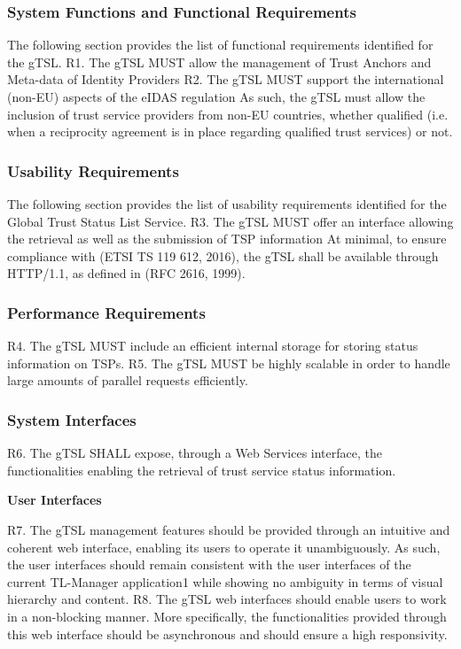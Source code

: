 \documentclass{tnreport}
\begin{document}
\subsubsection{System Functions and Functional Requirements}

The following section provides the list of functional requirements identified for the gTSL.
R1. The gTSL MUST allow the management of Trust Anchors and Meta-data of Identity Providers
R2. The gTSL MUST support the international (non-EU) aspects of the eIDAS regulation
As such, the gTSL must allow the inclusion of trust service providers from non-EU countries, whether qualified (i.e. when a reciprocity agreement is in place regarding qualified trust services) or not.

\subsubsection{Usability Requirements}

The following section provides the list of usability requirements identified for the Global Trust Status List Service.
R3. The gTSL MUST offer an interface allowing the retrieval as well as the submission of TSP information
At minimal, to ensure compliance with (ETSI TS 119 612, 2016), the gTSL shall be available through HTTP/1.1, as defined in (RFC 2616, 1999).

\subsubsection{Performance Requirements}

R4. The gTSL MUST include an efficient internal storage for storing status information on TSPs.
R5. The gTSL MUST be highly scalable in order to handle large amounts of parallel requests efficiently.

\subsubsection{System Interfaces}

R6. The gTSL SHALL expose, through a Web Services interface, the functionalities enabling the retrieval of trust service status information.

\textbf{User Interfaces}

R7. The gTSL management features should be provided through an intuitive and coherent web interface, enabling its users to operate it unambiguously.
As such, the user interfaces should remain consistent with the user interfaces of the current TL-Manager application1 while showing no ambiguity in terms of visual hierarchy and content.
R8. The gTSL web interfaces should enable users to work in a non-blocking manner.
More specifically, the functionalities provided through this web interface should be asynchronous and should ensure a high responsivity.
\end{document}
